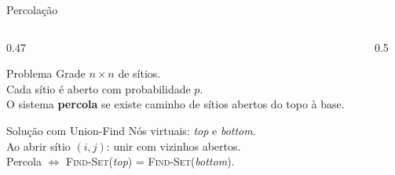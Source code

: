 \documentclass[aspectratio=169]{beamer}
\begin{document}
\begin{frame}[shrink=8]{Percolação}%
  \begin{columns}[T]
    \begin{column}{0.47\textwidth}
      \begin{block}{Problema}
        Grade $n \times n$ de sítios.\\
        Cada sítio é aberto com probabilidade $p$.\\
        O sistema \textbf{percola} se existe caminho de sítios abertos do topo à base.
      \end{block}
      \vspace{0.3cm}
      \begin{block}{Solução com Union-Find}
        Nós virtuais: \textit{top} e \textit{bottom}.\\
        Ao abrir sítio $(i,j)$: unir com vizinhos abertos.\\
        Percola $\iff$ \textsc{Find-Set}(\textit{top}) = \textsc{Find-Set}(\textit{bottom}).
      \end{block}
    \end{column}
    \begin{column}{0.5\textwidth}
    \end{column}
  \end{columns}
\end{frame}
\end{document}
